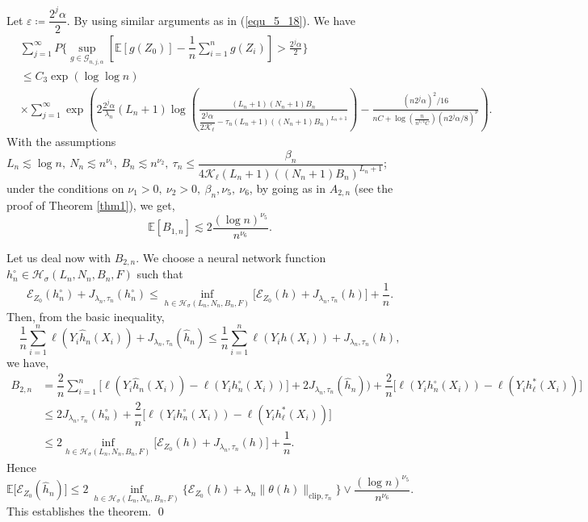 \documentclass[10pt,twoside]{article}
\numberwithin{equation}{section}
\newcommand{\E}{\ensuremath{\mathbb{E}}}
\begin{document}
%
Let $ \varepsilon \coloneqq  \dfrac{2^j \alpha}{2} $.
By using similar arguments as in (\ref{equ_5_18}).
We have
%
\begin{align}
\nonumber  & \sum_{j=1}^\infty P\Big\{\underset{ g \in \mathcal{G}_ {n, j, \alpha}}{\sup} \left[\E [g (Z_0)] - \dfrac{1}{n} \sum_{i=1}^n g (Z_i) \right] >  \frac{2^j \alpha}{2} \Big\} 
\\
\nonumber &  \leq C_{3}  \exp( \log \log n)  \\
\nonumber & \times \sum_{j=1}^\infty \exp\left( 2 \frac{2^j \alpha}{\lambda_n} (L_n + 1) \log \left(\frac{ (L_n + 1)(N_n + 1) B_n}{ \dfrac{2^j \alpha}{2 \mathcal{K}_{\ell}} - \tau_n(L_n +1)((N_n + 1)B_n)^{L_n + 1}} \right)  -\frac{(n 2^j \alpha)^2/16}{n C + \log(\frac{n}{n^ {1/4} C})(n 2^j \alpha /8)^ {\nu}} \right).
\end{align}
%
With the assumptions $ L_n \lesssim \log n, ~  N_n \lesssim n^{\nu_1}, ~ B_n \lesssim n^ {\nu_2}, ~ \tau_n \leq \dfrac{\beta_n}{4 \mathcal{K}_{\ell} (L_n +1)((N_n + 1) B_n)^ {L_n + 1}} $; under the conditions on $\nu_1 >0, ~ \nu_2 >0, ~ \beta_n, \nu_5, ~ \nu_6 $, by going as in $A_ {2, n} $ (see the proof of Theorem \ref{thm1}), we get,
%
\[ \E [B_ {1,n}] \lesssim  2 \dfrac{( \log n)^ { \nu_5} }{ n^{\nu_6}}. \]

\medskip

Let us deal now with $B_ {2, n} $.
%
We choose a neural network function $h_n^ {\circ} \in  \mathcal{H}_ {\sigma} (L_n, N_n, B_n, F) $ such that
%
\begin{equation}
\mathcal{E}_{Z_0} (h_n^\circ) + J_{\lambda_n, \tau_n} (h_n^\circ) \leq \underset{ h \in \mathcal{H}_ {\sigma} (L_n, N_n, B_n, F) }{ \inf} \Big[ \mathcal{E}_{Z_0} (h) +  J_ {\lambda_n, \tau_n} (h) \Big] + \dfrac{1}{n}.
\end{equation}
%
Then, from the basic inequality, 
%
\begin{equation*}
\dfrac{1}{n} \sum_{i=1}^{n} \ell(Y_i \widehat{h}_n (X_i)) +  J_{\lambda_n, \tau_n}(\widehat{h}_n) \leq \dfrac{1}{n} \sum_{i=1}^n  \ell(Y_i h (X_i))  +    J_{\lambda_n, \tau_n}(h), 
\end{equation*}
%
we have,
% 
\begin{align*}
\nonumber B_{2, n} & = \dfrac{2}{n} \sum_{i=1}^n  \Big[  \ell(Y_i \widehat{h}_n (X_i)) -  \ell(Y_i h_n^\circ (X_i))  \Big] + 2 J_{\lambda_n, \tau_n}(\widehat{h}_n ))
+ \dfrac{2}{n} \Big[ \ell(Y_i h_n^\circ (X_i)) - \ell(Y_i h^{*}_{\ell} (X_i)) \Big]
\\
\nonumber & \leq  2 J_{\lambda_n, \tau_n}(h_n^\circ ) +  \dfrac{2}{n} \Big[ \ell(Y_i h_n^\circ (X_i)) - \ell(Y_i h^{*}_{\ell} (X_i)) \Big]
\\
& \leq 2 \underset{ h \in \mathcal{H}_{\sigma} (L_n, N_n, B_n, F) }{ \inf} \Big[ \mathcal{E}_{Z_0} (h) +  J_{\lambda_n, \tau_n}(h) \Big] + \dfrac{1}{n}.
\end{align*}
%
Hence
%
\begin{equation*}
\E \Big[ \mathcal{E}_{Z_0} (\widehat{h}_n) \Big] \leq 2 ~ \underset{ h \in \mathcal{H}_{\sigma} (L_n, N_n, B_n, F) }{ \inf} \Big\{ \mathcal{E}_{Z_0} (h) +  \lambda_n \| \theta(h) \|_{\text{clip}, \tau_n} \Big\} \lor  \dfrac{ (\log n)^{\nu_5}}{ n^{\nu_6}}.
\end{equation*}
%
This establishes the theorem.
\qed 
%
%
\end{document}
